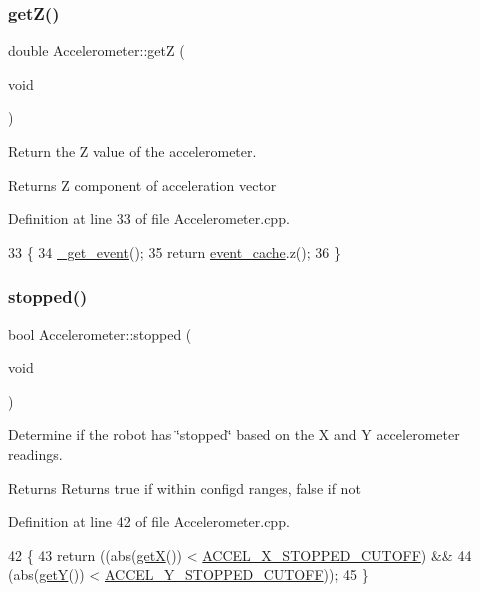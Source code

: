 \subsubsection{\texorpdfstring{get\+Z()}{getZ()}}
{\footnotesize\ttfamily double Accelerometer\+::getZ (\begin{DoxyParamCaption}\item[{void}]{ }\end{DoxyParamCaption})}



Return the Z value of the accelerometer. 

\begin{DoxyReturn}{Returns}
Z component of acceleration vector 
\end{DoxyReturn}


Definition at line 33 of file Accelerometer.\+cpp.


\begin{DoxyCode}
33                                \{
34     \hyperlink{class_accelerometer_a0a5be85959063e5bc2092668b59b9b97}{\_get\_event}();
35     \textcolor{keywordflow}{return} \hyperlink{class_accelerometer_a179b04d61746127f9264ce87ba6e20ce}{event\_cache}.z();
36 \}
\end{DoxyCode}
\mbox{\label{class_accelerometer_a88b653a985a23ebbed8916ef5a2cf0af}} 
\subsubsection{\texorpdfstring{stopped()}{stopped()}}
{\footnotesize\ttfamily bool Accelerometer\+::stopped (\begin{DoxyParamCaption}\item[{void}]{ }\end{DoxyParamCaption})}



Determine if the robot has \char`\"{}stopped\char`\"{} based on the X and Y accelerometer readings. 

\begin{DoxyReturn}{Returns}
Returns true if within config\textquotesingle{}d ranges, false if not 
\end{DoxyReturn}


Definition at line 42 of file Accelerometer.\+cpp.


\begin{DoxyCode}
42                                 \{
43     \textcolor{keywordflow}{return} ((abs(\hyperlink{class_accelerometer_a0570e1dd30592d3d4acc796fc4e67351}{getX}()) < \hyperlink{config_8h_ab38ef5d01a9fa64df5a2b664c96d2d2b}{ACCEL\_X\_STOPPED\_CUTOFF}) &&
44             (abs(\hyperlink{class_accelerometer_aba32b3d5b8a7c7f4e257f53551813b32}{getY}()) < \hyperlink{config_8h_a32225bb09b7533b752f9a649ed0f937e}{ACCEL\_Y\_STOPPED\_CUTOFF}));
45 \}
\end{DoxyCode}


